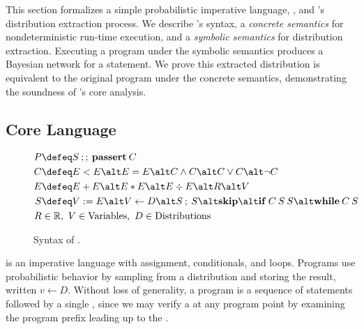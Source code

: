 \newenvironment{semantics}{
\begin{figure}[p]
}{
\end{figure}
}

This section formalizes a simple probabilistic imperative
language, \corelang,
and \tool's distribution
extraction process. %
We describe \corelang's 
syntax, a \emph{concrete semantics} for nondeterministic
run-time execution, and a \emph{symbolic semantics} for
distribution extraction. Executing a \corelang program under the
symbolic semantics produces a Bayesian network for a \passert statement. We
prove this extracted distribution is equivalent to the original program under
the concrete semantics, demonstrating the soundness of \tool's core analysis.

\subsection{Core Language}

\begin{figure}
    \begin{align*}
        P &\defeq S\:;;\:\mathbf{passert}\:C \\
        C &\defeq E < E \alt E = E \alt C \wedge C \alt C \vee C \alt \neg C \\
        E &\defeq E + E \alt E * E \alt E \div E \alt R \alt V \\
        S &\defeq V := E \alt V \leftarrow D \alt S\:;\:S \alt \mathbf{skip} \alt
        \mathbf{if}\:C\:S\:S \alt \mathbf{while}\:C\:S \\
        R &\in \mathbb{R}, 
        ~V \in \mathrm{Variables}, 
        ~D \in \mathrm{Distributions} \\
    \end{align*}
    \vspace{-5ex}
    \caption{Syntax of \corelang.}
    \label{passert:fig:syntax}
\end{figure}

\corelang is an imperative language with assignment, conditionals,
and loops. Programs use probabilistic behavior by sampling from a
distribution and storing the result, written $v \leftarrow D$.
Without loss of generality, a program is a sequence of statements followed by a
single \passert, since we may verify a \passert at any program point
by examining the program prefix leading up to the \passert.

